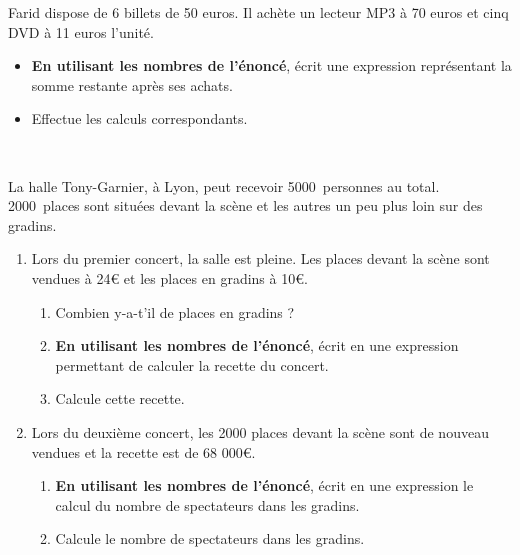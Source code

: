 \documentclass[a4paper,11pt]{article}
\begin{document}
\begin{question}[(2 points)]
	Farid dispose de 6 billets de 50 euros. Il achète un lecteur MP3 à 70 euros et cinq DVD à 11 euros l'unité.
	\begin{itemize}
		\item \textbf{En utilisant les nombres de l'énoncé}, écrit une expression représentant la somme restante après ses achats. \vspace{2em}
		\item Effectue les calculs correspondants. \vspace{6em}
	\end{itemize}
\end{question}

\begin{question}[(5 points)]\

	La halle Tony-Garnier, à Lyon, peut recevoir 5000 personnes au total. 2000 places sont situées devant la scène et les autres un peu plus loin sur des gradins.
	\begin{enumerate}
		\item
		      Lors du premier concert, la salle est pleine. Les places devant la scène sont vendues à 24€ et les places en gradins à 10€.
		      \begin{enumerate}
			      \item Combien y-a-t'il de places en gradins ?
			      \item \textbf{En utilisant les nombres de l'énoncé}, écrit en une expression permettant de calculer la recette du concert. \vspace{2em}
			      \item Calcule cette recette. \vspace{8em}
		      \end{enumerate}
		\item Lors du deuxième concert, les 2000 places devant la scène sont de nouveau vendues et la recette est de 68 000€.
		      \begin{enumerate}
			      \item \textbf{En utilisant les nombres de l'énoncé}, écrit en une expression le calcul du nombre de spectateurs dans les gradins. \vspace{2em}
			      \item Calcule le nombre de spectateurs dans les gradins. \vspace{8em}
		      \end{enumerate}
	\end{enumerate}
\end{question}
\end{document}

